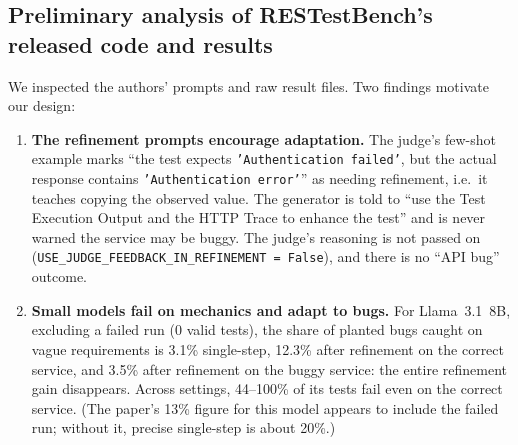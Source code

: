\documentclass[11pt,a4paper]{article}
\begin{document}
\subsection{Preliminary analysis of RESTestBench's released code and results}\label{sec:prelim}
We inspected the authors' prompts and raw result files. Two findings motivate our design:
\begin{enumerate}
  \item \textbf{The refinement prompts encourage adaptation.} The judge's few-shot example marks ``the test expects \texttt{'Authentication failed'}, but the actual response contains \texttt{'Authentication error'}'' as needing refinement, i.e.\ it teaches copying the observed value. The generator is told to ``use the Test Execution Output and the HTTP Trace to enhance the test'' and is never warned the service may be buggy. The judge's reasoning is not passed on (\texttt{USE\_JUDGE\_FEEDBACK\_IN\_REFINEMENT = False}), and there is no ``API bug'' outcome.
  \item \textbf{Small models fail on mechanics and adapt to bugs.} For Llama~3.1~8B, excluding a failed run (0 valid tests), the share of planted bugs caught on vague requirements is 3.1\% single-step, 12.3\% after refinement on the correct service, and 3.5\% after refinement on the buggy service: the entire refinement gain disappears. Across settings, 44--100\% of its tests fail even on the correct service. (The paper's 13\% figure for this model appears to include the failed run; without it, precise single-step is about 20\%.)
\end{enumerate}

\end{document}
